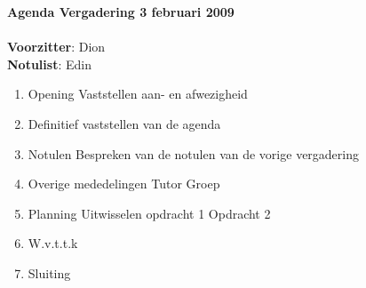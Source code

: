 \documentclass[11pt,oneside,a4paper]{article}
\begin{document}
\textbf{{\LARGE{Agenda Vergadering 3 februari 2009}}}\\ \\
\textbf{Voorzitter}: Dion\\
\textbf{Notulist}: Edin\\
\begin{enumerate}
    \item Opening
        \subitem Vaststellen aan- en afwezigheid
    \item Definitief vaststellen van de agenda
    \item Notulen
        \subitem Bespreken van de notulen van de vorige vergadering
    \item Overige mededelingen
        \subitem Tutor
        \subitem Groep
    \item Planning
            \subitem Uitwisselen opdracht 1
            \subitem Opdracht 2
    \item W.v.t.t.k
    \item Sluiting
\end{enumerate}
\end{document}
